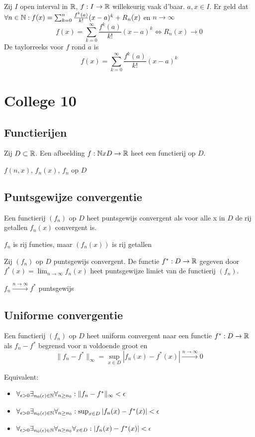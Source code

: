 \documentclass[week=1]{homework}
\begin{document}
	\Def Zij $I$ open interval in $\mathbb{R}$, $f : I \to \mathbb{R}$ willekeurig vaak d'baar. $a,x \in I$. 
	Er geld dat $\forall n \in \mathbb{N} : f(x) = \sum_{k=0}^{n} \frac{f^k(a)}{k!} (x-a)^k + R_n(x)$ en $n \to \infty$
	\[
		f(x) = \sum_{k=0}^{\infty} \frac{f^k(a)}{k!} (x-a)^k \Leftrightarrow R_n(x) \to 0
	\]
	De taylorreeks voor $f$ rond $a$ is 
	\[
	f(x) = \sum_{k=0}^{\infty} \frac{f^k(a)}{k!} (x-a)^k
	\]
	
	\newpage
	\section*{College 10}

	\subsection*{Functierijen}

	\Def Zij $D \subset \mathbb{R}$. Een afbeelding $f : \mathbb{N} x D \to \mathbb{R}$ heet een functierij op $D$. 
	
	\Not $f(n,x)$, $f_n(x)$, $f_n$ op $D$
	
	\subsection*{Puntsgewijze convergentie}
	
	\Def Een functierij $(f_n)$ op $D$ heet puntsgewijs convergent als voor alle x in $D$ de rij getallen $f_n(x)$ convergent is. 
	
	\Not $f_n$ is rij functies, maar $(f_n(x))$ is rij getallen
	
	\Def Zij $(f_n)$ op $D$ puntsgewijs convergent. De functie $f^* : D \to \mathbb{R}$ gegeven door $f^*(x) = \lim_{n \to \infty} f_n(x)$ heet puntsgewijze limiet van de functierij $(f_n)$.
	
	\Not $f_n \xrightarrow{n \to \infty} f^*$ puntsgewijs
	
	\subsection*{Uniforme convergentie}
	
	\Def Een functierij $(f_n)$ op $D$ heet uniform convergent naar een functie $f^* : D \to \mathbb{R}$ als $f_n - f^*$ begrensd voor n voldoende groot en 
	\[
		\|f_n - f^* \|_{\infty} = \sup_{x \in D} |f_n(x) - f^*(x)| \xrightarrow{n \to \infty} 0
	\]
	
	\Stel Equivalent:
	\begin{itemize}
		\item $\forall_{\epsilon > 0} \exists_{n_0(\epsilon) \in \naturals} \forall_{n \ge n_0} : \|f_n - f^*\|_{\infty} < \epsilon$ 
		\item $\forall_{\epsilon > 0} \exists_{n_0(\epsilon) \in \naturals} \forall_{n \ge n_0} : \sup_{x \in D} |f_n(x) - f^*(x)| < \epsilon$ 
		\item $\forall_{\epsilon > 0} \exists_{n_0(\epsilon) \in \naturals} \forall_{n \ge n_0} \forall_{x \in D} : |f_n(x) - f^*(x)| < \epsilon$ 
	\end{itemize}
	
\end{document}
